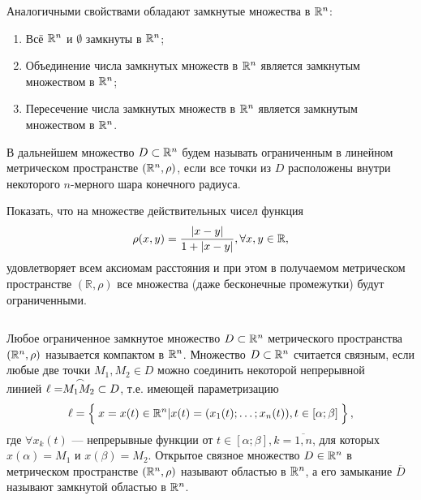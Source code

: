 \begin{note}
	Аналогичными свойствами обладают замкнутые множества в $\mathbb{R}^n$:
\end{note}
\begin{enumerate}
	\item Всё $\mathbb{R}^n$ и $\emptyset$ замкнуты в $\mathbb{R}^n$;
	\item Объединение  числа замкнутых множеств в $\mathbb{R}^n$ является замкнутым множеством в $\mathbb{R}^n$;
	\item Пересечение  числа замкнутых множеств в $\mathbb{R}^n$ является замкнутым множеством в $\mathbb{R}^n$.
\end{enumerate}

В дальнейшем множество $D \subset \mathbb{R}^n$ будем называть ограниченным в линейном метрическом пространстве $\left( \mathbb{R}^n, \rho \right)$, если все точки из $D$ расположены внутри некоторого $n$-мерного шара конечного радиуса.

\begin{exercise}
	Показать, что на множестве действительных чисел функция
	\begin{equation*}
	\rho (x, y) = \dfrac{\left\lvert x-y \right\rvert}{1 + \left\lvert x-y \right\rvert}, \forall x, y \in \mathbb{R},
	\end{equation*}
	удовлетворяет всем аксиомам расстояния и при этом в получаемом метрическом пространстве $\left(\mathbb{R}, \rho \right)$ все множества (даже бесконечные промежутки) будут ограниченными.
\end{exercise}

$  $\newline

	Любое ограниченное замкнутое множество $D \subset \mathbb{R}^n$ метрического пространства $\left(\mathbb{R}^n, \rho \right)$ называется компактом в $\mathbb{R}^n$. Множество $D \subset \mathbb{R}^n$ считается связным, если любые две точки $M_1, M_2 \in D$ можно соединить некоторой непрерывной \\
	линией $\ell = \arc{M_1 M_2} \; \subset D$, т.е. имеющей параметризацию 
	\begin{equation*}
	\ell = \left\{ \dfrac{ }{} x= x(t) \in \mathbb{R}^n | x(t) = (x_1 (t); \ldots; x_n (t) ), t \in [\alpha; \beta] \dfrac{ }{} \right\},
	\end{equation*}
	где $\forall x_k (t)$ — непрерывные функции от $t \in [\alpha; \beta], k = \overline{1, n}$, для которых $x(\alpha) = M_1$ и ${x(\beta) = M_2.}$ 
    Открытое связное множество $D \in \mathbb{R}^n$ в метрическом пространстве $\left(\mathbb{R}^n, \rho \right)$ называют областью в $\mathbb{R}^n$, а его замыкание $\overline{D}$ называют замкнутой областью в $\mathbb{R}^n$.

$ $\newpage$   $